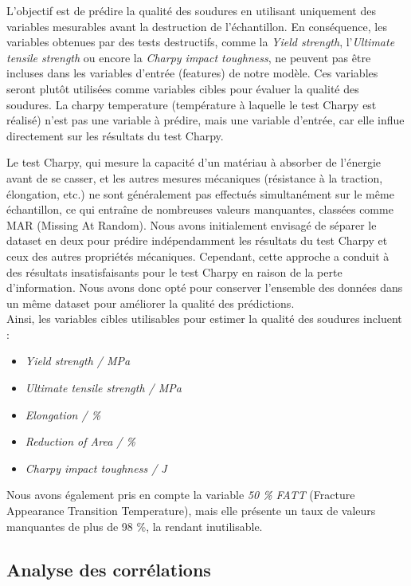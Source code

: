 \documentclass{article}
\newcommand{\bcite}[1]{\textbf{\cite{#1}}}
\begin{document}
L’objectif est de prédire la qualité des soudures en utilisant uniquement des variables mesurables avant la destruction de l'échantillon. En conséquence, les variables obtenues par des tests destructifs, comme la \textit{Yield strength}, l'\textit{Ultimate tensile strength} ou encore la \textit{Charpy impact toughness}, ne peuvent pas être incluses dans les variables d'entrée (features) de notre modèle. Ces variables seront plutôt utilisées comme variables cibles pour évaluer la qualité des soudures. La charpy temperature (température à laquelle le test Charpy est réalisé) n'est pas une variable à prédire, mais une variable d'entrée, car elle influe directement sur les résultats du test Charpy.

Le test Charpy, qui mesure la capacité d'un matériau à absorber de l'énergie avant de se casser, et les autres mesures mécaniques (résistance à la traction, élongation, etc.) ne sont généralement pas effectués simultanément sur le même échantillon, ce qui entraîne de nombreuses valeurs manquantes, classées comme MAR (Missing At Random). Nous avons initialement envisagé de séparer le dataset en deux pour prédire indépendamment les résultats du test Charpy et ceux des autres propriétés mécaniques. Cependant, cette approche a conduit à des résultats insatisfaisants pour le test Charpy en raison de la perte d'information. Nous avons donc opté pour conserver l'ensemble des données dans un même dataset pour améliorer la qualité des prédictions.\\

Ainsi, les variables cibles utilisables pour estimer la qualité des soudures incluent :

\begin{itemize} \item \textit{Yield strength / MPa} \item \textit{Ultimate tensile strength / MPa} \item \textit{Elongation / \%} \item \textit{Reduction of Area / \%} \item \textit{Charpy impact toughness / J} \end{itemize}

Nous avons également pris en compte la variable \textit{50 \% FATT} (Fracture Appearance Transition Temperature)\bcite{ImpVis}, mais elle présente un taux de valeurs manquantes de plus de 98 \%, la rendant inutilisable.

\subsection{Analyse des corrélations}
\end{document}
